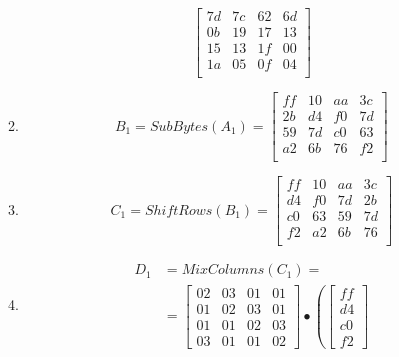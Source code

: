 \documentclass[a4paper, 14pt]{extarticle}
\begin{document}
\begin{enumerate}
\begin{enumerate}
\begin{equation}
\begin{bmatrix}
                    7d & 7c & 62 & 6d \\
                    0b & 19 & 17 & 13 \\
                    15 & 13 & 1f & 00 \\
                    1a & 05 & 0f & 04 \\
                \end{bmatrix}
            \end{equation}
        \item \begin{equation}
                B_1 = SubBytes(A_1) = \begin{bmatrix}
                    ff & 10 & aa & 3c \\
                    2b & d4 & f0 & 7d \\
                    59 & 7d & c0 & 63 \\
                    a2 & 6b & 76 & f2 \\
                \end{bmatrix}
            \end{equation}
        \item \begin{equation}
                C_1 = ShiftRows(B_1) = \begin{bmatrix}
                    ff & 10 & aa & 3c \\
                    d4 & f0 & 7d & 2b \\
                    c0 & 63 & 59 & 7d \\
                    f2 & a2 & 6b & 76 \\
                \end{bmatrix}
        \end{equation}
        \item \begin{equation}
            \begin{split}
                D_1 &= MixColumns(C_1) = \\ &= \begin{bmatrix}
                    02 & 03 & 01 & 01 \\
                    01 & 02 & 03 & 01 \\
                    01 & 01 & 02 & 03 \\
                    03 & 01 & 01 & 02
                \end{bmatrix} \bullet \left( \begin{bmatrix}
                    ff \\ d4 \\ c0 \\ f2

\end{bmatrix}
\end{split}
\end{equation}
\end{enumerate}
\end{enumerate}
\end{document}
